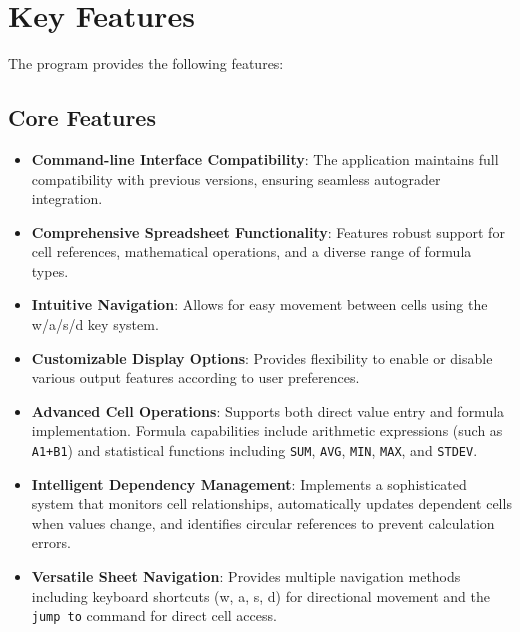 \documentclass[12pt]{article}
\begin{document}
\section{Key Features}
The program provides the following features:

\subsection{Core Features} 
\begin{itemize}
\item \textbf{Command-line Interface Compatibility}: The application maintains full compatibility with previous versions, ensuring seamless autograder integration.
\item \textbf{Comprehensive Spreadsheet Functionality}: Features robust support for cell references, mathematical operations, and a diverse range of formula types.
\item \textbf{Intuitive Navigation}: Allows for easy movement between cells using the w/a/s/d key system.
\item \textbf{Customizable Display Options}: Provides flexibility to enable or disable various output features according to user preferences.
\item \textbf{Advanced Cell Operations}: Supports both direct value entry and formula implementation. Formula capabilities include arithmetic expressions (such as \texttt{A1+B1}) and statistical functions including \texttt{SUM}, \texttt{AVG}, \texttt{MIN}, \texttt{MAX}, and \texttt{STDEV}.
\item \textbf{Intelligent Dependency Management}: Implements a sophisticated system that monitors cell relationships, automatically updates dependent cells when values change, and identifies circular references to prevent calculation errors.
\item \textbf{Versatile Sheet Navigation}: Provides multiple navigation methods including keyboard shortcuts (w, a, s, d) for directional movement and the \texttt{ jump to} command for direct cell access.
\end{itemize}
\end{document}
